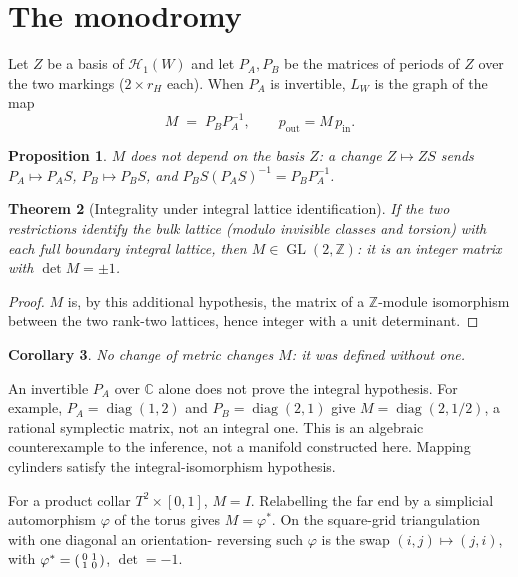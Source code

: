 \documentclass[11pt]{article}
\newtheorem{theorem}{Theorem}[section]
\newtheorem{proposition}[theorem]{Proposition}
\newtheorem{corollary}[theorem]{Corollary}
\theoremstyle{definition}
\theoremstyle{remark}
\newcommand{\Z}{\mathbb{Z}}
\newcommand{\C}{\mathbb{C}}
\newcommand{\Hgroup}{\mathcal{H}}
\newcommand{\GL}{\operatorname{GL}}
\begin{document}
\section{The monodromy}\label{sec:monodromy}

Let $Z$ be a basis of $\Hgroup_1(W)$ and let $P_A, P_B$ be the matrices of
periods of $Z$ over the two markings ($2 \times r_H$ each). When $P_A$ is
invertible, $L_W$ is the graph of the map
\[
  M \;=\; P_B P_A^{-1}, \qquad p_{\text{out}} = M\, p_{\text{in}}.
\]

\begin{proposition}\label{prop:basisfree}
$M$ does not depend on the basis $Z$: a change $Z \mapsto ZS$ sends
$P_A \mapsto P_A S$, $P_B \mapsto P_B S$, and $P_B S (P_A S)^{-1} = P_B P_A^{-1}$.
\end{proposition}

\begin{theorem}[Integrality under integral lattice identification]\label{thm:integer}
If the two restrictions identify the bulk lattice (modulo invisible classes
and torsion) with each full boundary integral lattice, then
$M \in \GL(2,\Z)$: it is an integer matrix with $\det M = \pm 1$.
\end{theorem}
\begin{proof}
$M$ is, by this additional hypothesis, the matrix of a $\Z$-module
isomorphism between the two rank-two lattices, hence integer with a unit
determinant.
\end{proof}

\begin{corollary}
No change of metric changes $M$: it was defined without one.
\end{corollary}

An invertible $P_A$ over $\C$ alone does not prove the integral hypothesis.
For example, $P_A=\operatorname{diag}(1,2)$ and
$P_B=\operatorname{diag}(2,1)$ give $M=\operatorname{diag}(2,1/2)$, a
rational symplectic matrix, not an integral one. This is an algebraic
counterexample to the inference, not a manifold constructed here.
Mapping cylinders satisfy the integral-isomorphism hypothesis.

For a product collar $T^2 \times [0,1]$, $M = I$. Relabelling the far end
by a simplicial automorphism $\varphi$ of the torus gives $M = \varphi^*$.
On the square-grid triangulation with one diagonal an orientation-
reversing such $\varphi$ is the swap $(i,j)\mapsto(j,i)$, with $\varphi^* =
\begin{psmallmatrix}0&1\\1&0\end{psmallmatrix}$, $\det = -1$.
\end{document}
